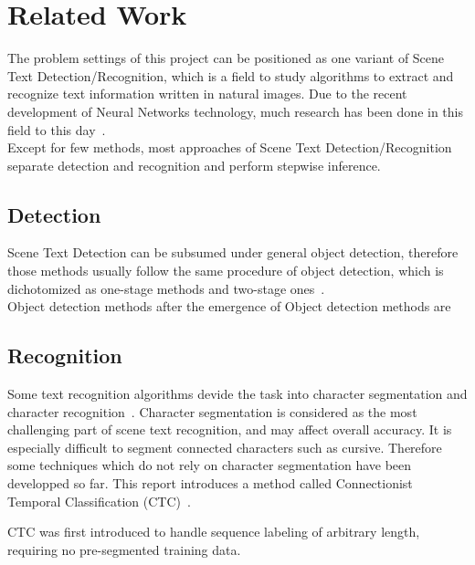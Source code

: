 \section{Related Work}

The problem settings of this project can be positioned as one variant of Scene Text Detection/Recognition, which
is a field to study algorithms to extract and recognize text information written in natural images.
Due to the recent development of Neural Networks technology,
much research has been done in this field to this day~\cite{long2018scene}.\\
Except for few methods\cite{liu2018fots}\cite{lyu2018mask}, most approaches of Scene Text Detection/Recognition
separate detection and recognition and perform stepwise inference.

\subsection{Detection}

Scene Text Detection can be subsumed under general object detection, therefore those methods usually follow
the same procedure of object detection, which is dichotomized as one-stage methods and two-stage ones~\cite{liu2018deep}.\\

Object detection methods after the emergence of Object detection methods are

\subsection{Recognition}

Some text recognition algorithms devide the task into character segmentation and character recognition~\cite{bissacco2013photoocr}\cite{phan2011gradient}.
Character segmentation is considered as the most challenging part of scene text recognition, and may affect
overall accuracy. It is especially difficult to segment connected characters such as cursive.
Therefore some techniques which do not rely on character segmentation have been developped so far.
This report introduces a method called Connectionist Temporal Classification (CTC)~\cite{graves2006connectionist}.

CTC was first introduced to handle sequence labeling of arbitrary length,
requiring no pre-segmented training data.
